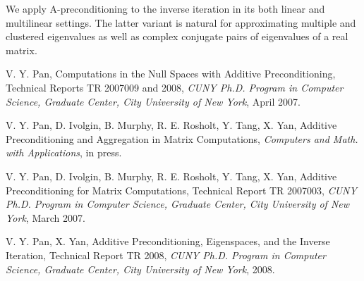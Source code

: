 \documentclass{report}
\begin{document}
We apply A-preconditioning to the inverse iteration in its both linear
and multilinear settings. The latter variant is natural for approximating
multiple and clustered eigenvalues as well as complex conjugate pairs of
eigenvalues of a real matrix.

\begin{thebibliography}{\hspace{0.2in}}

V. Y. Pan,
Computations in the Null Spaces with Additive Preconditioning,
Technical Reports TR 2007009 and 2008, {\em CUNY Ph.D. Program
in Computer Science, Graduate Center, City University of New York}, April 2007.

V. Y. Pan, D. Ivolgin, B. Murphy, R. E. Rosholt, Y. Tang, X. Yan,
Additive Preconditioning and Aggregation in Matrix Computations,
{\em Computers and Math. with Applications}, in press.

V. Y. Pan, D. Ivolgin, B. Murphy, R. E. Rosholt, Y. Tang, X. Yan,
Additive Preconditioning for Matrix Computations,
Technical Report TR 2007003, {\em CUNY Ph.D. Program
in Computer Science, Graduate Center, City University of New York}, March 2007.

V. Y. Pan, X. Yan,
Additive Preconditioning, Eigenspaces, and the Inverse Iteration,
Technical Report TR 2008, {\em CUNY Ph.D. Program
in Computer Science, Graduate Center, City University of New York}, 2008.

\end{thebibliography}
\end{document}
